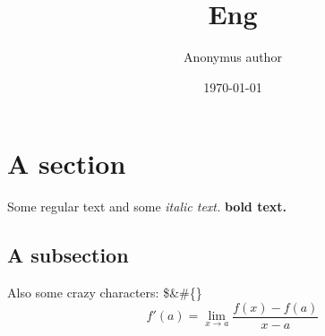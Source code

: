 \documentclass{article}%
\title{Eng}%
\author{Anonymus author}%
\date{\today}%
\begin{document}
%
\normalsize%
\maketitle%
\section{A section}%
\label{sec:Asection}%
Some regular text and some %
\textit{italic text. }%
\textbf{bold text. }%
\subsection{A subsection}%
\label{subsec:Asubsection}%
Also some crazy characters: \$\&\#\{\}%
$$f'(a) = \lim_{x \to a} \frac{f(x) - f(a)}{x-a}$$

%
\end{document}
